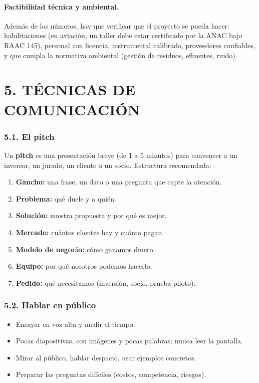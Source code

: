 \paragraph*{Factibilidad técnica y ambiental.}
Además de los números, hay que verificar que el proyecto se pueda hacer: habilitaciones (en
aviación, un taller debe estar certificado por la ANAC bajo RAAC 145), personal con licencia,
instrumental calibrado, proveedores confiables, y que cumpla la normativa ambiental (gestión
de residuos, efluentes, ruido).

\section*{5. TÉCNICAS DE COMUNICACIÓN}

\subsubsection*{5.1. El pitch}
Un \textbf{pitch} es una presentación breve (de 1 a 5 minutos) para convencer a un inversor,
un jurado, un cliente o un socio. Estructura recomendada:
\begin{enumerate}
  \item \textbf{Gancho:} una frase, un dato o una pregunta que capte la atención.
  \item \textbf{Problema:} qué duele y a quién.
  \item \textbf{Solución:} nuestra propuesta y por qué es mejor.
  \item \textbf{Mercado:} cuántos clientes hay y cuánto pagan.
  \item \textbf{Modelo de negocio:} cómo ganamos dinero.
  \item \textbf{Equipo:} por qué nosotros podemos hacerlo.
  \item \textbf{Pedido:} qué necesitamos (inversión, socio, prueba piloto).
\end{enumerate}

\subsubsection*{5.2. Hablar en público}
\begin{itemize}
  \item Ensayar en voz alta y medir el tiempo.
  \item Pocas diapositivas, con imágenes y pocas palabras; nunca leer la pantalla.
  \item Mirar al público, hablar despacio, usar ejemplos concretos.
  \item Preparar las preguntas difíciles (costos, competencia, riesgos).
\end{itemize}


